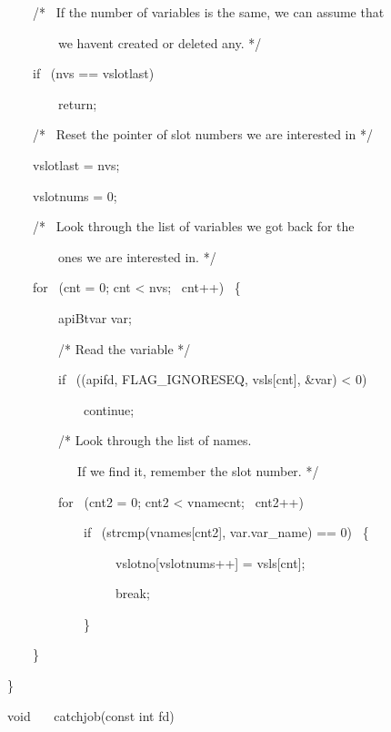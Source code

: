 \begin{exparasmall}
\ \ \ \ /* \ If the number of variables is the same, we can assume that

\ \ \ \ \ \ \ \ we haven{\textquotesingle}t created or deleted any. */

\bigskip


\ \ \ \ if \ (nvs == vslotlast)

\ \ \ \ \ \ \ \ return;

\bigskip


\ \ \ \ /* \ Reset the pointer of slot numbers we are interested in */

\bigskip


\ \ \ \ vslotlast = nvs;

\ \ \ \ vslotnums = 0;

\bigskip


\ \ \ \ /* \ Look through the list of variables we got back for the

\ \ \ \ \ \ \ \ ones we are interested in. */

\bigskip


\ \ \ \ for \ (cnt = 0; cnt {\textless} nvs; \ cnt++) \ \{

\ \ \ \ \ \ \ \ apiBtvar var;

\bigskip


\ \ \ \ \ \ \ \ /* Read the variable */

\bigskip


\ \ \ \ \ \ \ \ if \ (\funcnameXBvarread{}(apifd, \constprefix{}FLAG\_IGNORESEQ,
vsls[cnt], \&var) {\textless} 0)

\ \ \ \ \ \ \ \ \ \ \ \ continue;

\bigskip


\ \ \ \ \ \ \ \ /* Look through the list of names.

\ \ \ \ \ \ \ \ \ \ \ If we find it, remember the slot number. */

\bigskip


\ \ \ \ \ \ \ \ for \ (cnt2 = 0; cnt2 {\textless} vnamecnt; \ cnt2++)

\ \ \ \ \ \ \ \ \ \ \ \ if \ (strcmp(vnames[cnt2], var.var\_name) == 0)
\ \{

\ \ \ \ \ \ \ \ \ \ \ \ \ \ \ \ \ vslotno[vslotnums++] = vsls[cnt];

\ \ \ \ \ \ \ \ \ \ \ \ \ \ \ \ \ break;

\ \ \ \ \ \ \ \ \ \ \ \ \}

\ \ \ \ \}

\}

\bigskip


void \ \ \ catchjob(const int fd)


\end{exparasmall}
